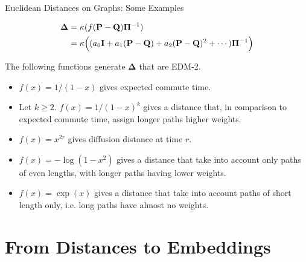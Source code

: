 \documentclass[professionalfonts, hyperref={pdfpagelabels=false,
  colorlinks=true, linkcolor=purple}]{beamer}
\begin{document}
\begin{frame}{Euclidean Distances on Graphs: Some Examples}
  \begin{alertblock}{}
    \begin{equation*}
      \begin{split}
        \bm{\Delta} &= \kappa(f(\mathbf{P} - \mathbf{Q}) \bm{\Pi}^{-1}) \\ 
        &= \kappa\Bigl((a_0
        \mathbf{I} + a_1 (\mathbf{P} - \mathbf{Q}) + a_2 (\mathbf{P} -
        \mathbf{Q})^2 + \cdots)\bm{\Pi}^{-1}\Bigr)
      \end{split}
    \end{equation*}
  \end{alertblock}

  \vskip 10pt The following functions generate $\bm{\Delta}$ that are
  EDM-2.
  \begin{itemize}
  \item $f(x) = 1/(1-x)$ gives expected commute time.
  \item Let $k \geq 2$. $f(x) = 1/(1-x)^k$ gives a distance that, in comparison to
    expected commute time, assign longer paths higher weights.
  \item $f(x) = x^{2r}$ gives diffusion distance at time $r$.
  \item $f(x) = - \log{(1-x^2)}$ gives a distance that 
    take into account only paths of even lengths, with longer paths having
    lower weights.
  \item $f(x) = \exp(x)$ gives a distance that take into
    account paths of short length only, i.e. long paths have almost
    no weights.
  \end{itemize}
  \end{frame}

\section{From Distances to Embeddings}
\end{document}
